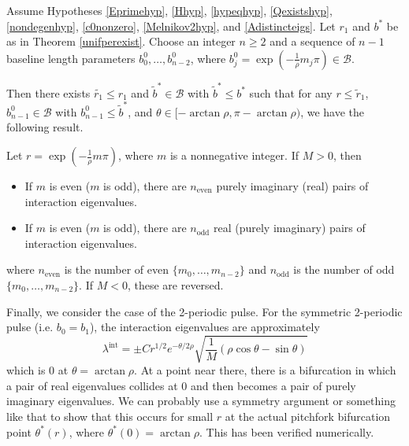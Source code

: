 \documentclass[thesis.tex]{subfiles}
\begin{document}
\begin{theorem}\label{inteigsparity}
Assume Hypotheses \ref{Eprimehyp}, \ref{Hhyp}, \ref{hypeqhyp}, \ref{Qexistshyp}, \ref{nondegenhyp}, \ref{c0nonzero}, \ref{Melnikov2hyp}, and \ref{Adistincteigs}. Let $r_1$ and $b^*$ be as in Theorem \ref{unifperexist}. Choose an integer $n \geq 2$ and a sequence of $n-1$ baseline length parameters $b_0^0, \dots, b_{n-2}^0$, where $b_j^0 = \exp\left(-\frac{1}{\rho}m_j \pi\right) \in \mathcal{B}$. 

Then there exists $\tilde{r_1} \leq r_1$ and $\tilde{b}^* \in \mathcal{B}$ with $\tilde{b}^* \leq b^*$ such that for any $r \leq \tilde{r}_1$, $b_{n-1}^0 \in \mathcal{B}$ with $b_{n-1}^0 \leq \tilde{b}^*$, and $\theta \in [-\arctan \rho, \pi - \arctan \rho)$, we have the following result.

Let $r = \exp\left( -\frac{1}{\rho} m \pi \right)$, where $m$ is a nonnegative integer. If $M > 0$, then 
\begin{itemize}
\item If $m$ is even ($m$ is odd), there are $n_{\text{even}}$ purely imaginary (real) pairs of interaction eigenvalues.
\item If $m$ is even ($m$ is odd), there are $n_{\text{odd}}$ real (purely imaginary) pairs of interaction eigenvalues.
\end{itemize}
where $n_{\text{even}}$ is the number of even $\{m_0, \dots, m_{n-2}\}$ and $n_{\text{odd}}$ is the number of odd $\{m_0, \dots, m_{n-2}\}$. If $M < 0$, these are reversed.
\end{theorem}

Finally, we consider the case of the 2-periodic pulse. For the symmetric 2-periodic pulse (i.e. $b_0 = b_1$), the interaction eigenvalues are approximately
\[
\lambda^{\text{int}} = \pm C r^{1/2} e^{-\theta/2\rho} \sqrt{ \frac{1}{M} \left( \rho \cos \theta - \sin \theta \right) }
\]
which is 0 at $\theta = \arctan \rho$. At a point near there, there is a bifurcation in which a pair of real eigenvalues collides at 0 and then becomes a pair of purely imaginary eigenvalues. We can probably use a symmetry argument or something like that to show that this occurs for small $r$ at the actual pitchfork bifurcation point $\theta^*(r)$, where $\theta^*(0) = \arctan \rho$. This has been verified numerically.

\iffulldocument\else
	
	
\fi
\end{document}
